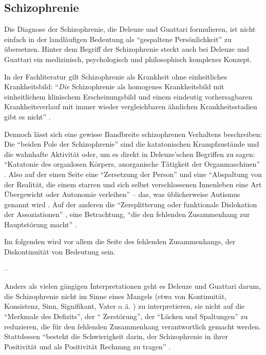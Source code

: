 \documentclass[12pt,
               DIV13,
               paper=a4,
               twoside=false,
               onehalfspacing,
               bibliography=totoc,
               toc=graduated,
               draft,
               ]{scrartcl}
\newcommand{\pc}[2]{\parencite[#1]{#2}}
\newcommand{\vgl}[2]{\parencite[vgl.][#1]{#2}}
\newcommand{\worries}[1]{\ifdraft{\textcolor{blue}{\texttt{(#1)}}}{}}
\newcommand{\gwg}{G--W--G'\xspace}
\begin{document}
\subsection{Schizophrenie}

Die Diagnose der Schizophrenie, die Deleuze und Guattari formulieren,
ist nicht einfach in der landläufigen Bedeutung als "`gespaltene
Persönlichkeit"' zu übersetzen. Hinter dem Begriff der Schizophrenie
steckt auch bei Deleuze und Guattari ein medizinisch, psychologisch
und philosophisch komplexes Konzept.

In der Fachliteratur gilt Schizophrenie als Krankheit ohne
einheitliches Krankheitsbild: "`\emph{Die} Schizophrenie als homogenes
Krankheitsbild mit einheitlichem klinischem Erscheinungsbild und einem
eindeutig vorhersagbaren Krankheitsverlauf mit immer wieder
vergleichbaren ähnlichen Krankheitsstadien gibt es nicht"'
\pc{799}{psych}.

Dennoch lässt sich eine gewisse Bandbreite schizophrenen Verhaltens
beschreiben: Die "`beiden Pole der Schizophrenie"' \pc{21}{schizg}
sind die katatonischen Krampfzustände und die wahnhafte Aktivität
oder, um es direkt in Deleuze'schen Begriffen zu sagen: "`Katatonie
des organlosen Körpers, anorganische Tätigkeit der Organmaschinen"'
\pc{21}{schizg}. Also auf der einen Seite eine "`Zersetzung der
Person"' und eine "`Abspaltung von der Realität, die einem starren und
sich selbst verschlossenen Innenleben eine Art Übergewicht oder
Autonomie verleihen"' \pc{23}{schizg} -- das, was üblicherweise
Autismus genannt wird \vgl{801}{psych}. Auf der anderen die
"`Zersplitterung oder funktionale Dislokation der Assoziationen"'
\pc{23}{schizg}, eine Betrachtung, "`die den fehlenden Zusammenhang
zur Hauptstörung macht"' \pc{23}{schizg}.

\worries{\gwg auch als Autismus?}

Im folgenden wird vor allem die Seite des fehlenden Zusammenhangs, der
Diskontinuität von Bedeutung sein.

--

Anders als vielen gängigen Interpretationen geht es Deleuze und
Guattari darum, die Schizophrenie nicht im Sinne eines Mangels (etwa
von Kontinuität, Konsistenz, Sinn, Signifikant, Vater o.\,ä.
\vgl{24}{schizg} \worries{+ ganz woanders?}) zu interpretieren, sie
nicht auf die "`Merkmale des Defizits"', der "` Zerstörung"', der
"`Lücken und Spaltungen"' \pc{24}{schizg} zu reduzieren, die für den
fehlenden Zusammenhang verantwortlich gemacht werden. Stattdessen
"`besteht die Schwierigkeit darin, der Schizophrenie in ihrer
Positivität und als Positivität Rechnung zu tragen"' \pc{24}{schizg}.
\end{document}
